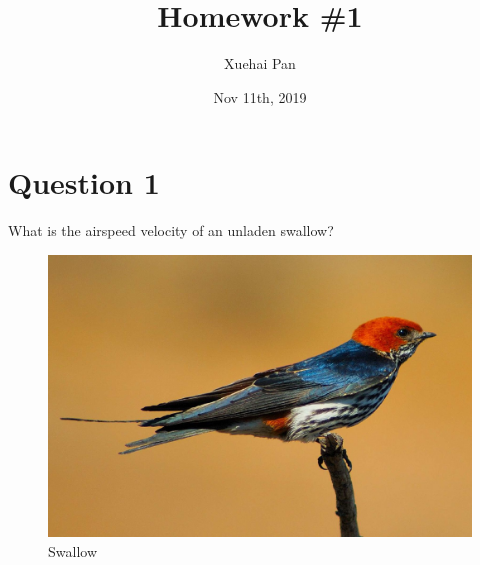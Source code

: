 \documentclass[
  UTF8, %
  12pt, %
]{assigment}
\title{Homework \#1} %
\author{Xuehai Pan} %
\date{Nov 11th, 2019} %
\institute{School of Electronics Engineering and Computer Science \\ Peking University} %
\begin{document}
\maketitle %


\section*{Question 1}

\begin{problem}
What is the airspeed velocity of an unladen swallow?
\end{problem}

\begin{figure}[H]
  \centering
  \includegraphics[width=0.5\columnwidth]{swallow.jpg} %
  \caption{Swallow}
  \label{fig:swallow}
\end{figure}
\end{document}
